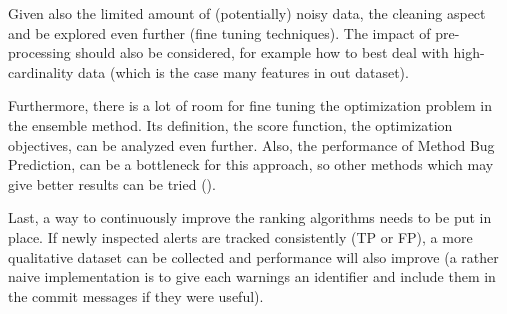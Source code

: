 Given also the limited amount of (potentially) noisy data, the cleaning aspect and be explored even further (fine tuning techniques). The impact of pre-processing should also be considered, for example how to best deal with high-cardinality data (which is the case many features in out dataset).

Furthermore, there is a lot of room for fine tuning the optimization problem in the ensemble method. Its definition, the score function, the optimization objectives, can be analyzed even further. Also, the performance of Method Bug Prediction, can be a bottleneck for this approach, so other methods which may give better results can be tried (\cite{predict_deeplearning, dl_jit_prediction}).

Last, a way to continuously improve the ranking algorithms needs to be put in place. If newly inspected alerts are tracked consistently (TP or FP), a more qualitative dataset can be collected and performance will also improve (a rather naive implementation is to give each warnings an identifier and include them in the commit messages if they were useful).

